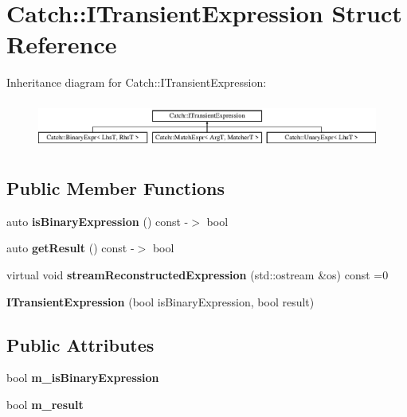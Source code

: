 \hypertarget{struct_catch_1_1_i_transient_expression}{}\section{Catch\+:\+:I\+Transient\+Expression Struct Reference}
\label{struct_catch_1_1_i_transient_expression}
Inheritance diagram for Catch\+:\+:I\+Transient\+Expression\+:\begin{figure}[H]
\begin{center}
\leavevmode
\includegraphics[height=1.588652cm]{struct_catch_1_1_i_transient_expression}
\end{center}
\end{figure}
\subsection*{Public Member Functions}
\begin{DoxyCompactItemize}
\item 
\mbox{\label{struct_catch_1_1_i_transient_expression_a3b436e13a0a6d3522bbf70d4e31deb22}} 
auto {\bfseries is\+Binary\+Expression} () const -\/$>$ bool
\item 
\mbox{\label{struct_catch_1_1_i_transient_expression_a101c7db86c87eff93a8ff496720e6320}} 
auto {\bfseries get\+Result} () const -\/$>$ bool
\item 
\mbox{\label{struct_catch_1_1_i_transient_expression_aabe1889df9c6e639a24afb08d8a0fe9e}} 
virtual void {\bfseries stream\+Reconstructed\+Expression} (std\+::ostream \&os) const =0
\item 
\mbox{\label{struct_catch_1_1_i_transient_expression_aafe69572b7ed884e63ec81f58d4afd8c}} 
{\bfseries I\+Transient\+Expression} (bool is\+Binary\+Expression, bool result)
\end{DoxyCompactItemize}
\subsection*{Public Attributes}
\begin{DoxyCompactItemize}
\item 
\mbox{\label{struct_catch_1_1_i_transient_expression_a75ce48da824d514d08152d396abb28d8}} 
bool {\bfseries m\+\_\+is\+Binary\+Expression}
\item 
\mbox{\label{struct_catch_1_1_i_transient_expression_a4646e2b5e0156e913653ec3b9b60c942}} 
bool {\bfseries m\+\_\+result}
\end{DoxyCompactItemize}


